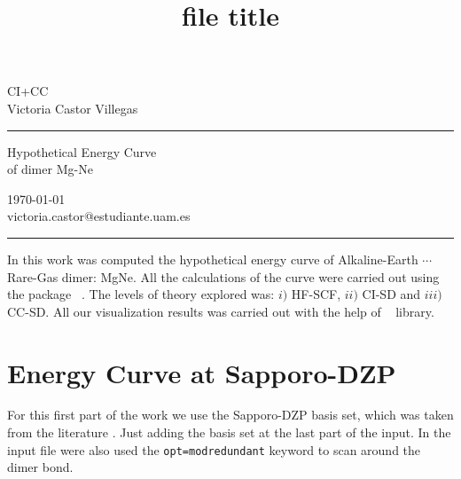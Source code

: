{\setlength{\parindent}{0pt}
\title{file title} %
\fancyhead[C]{}
\begin{minipage}{0.295\textwidth} %
\raggedright
CI+CC\\ %
\footnotesize %
Victoria Castor Villegas %
\medskip\hrule
\end{minipage}
\begin{minipage}{0.4\textwidth} %
\centering 
\large %
Hypothetical Energy Curve\\ %
\normalsize %
of dimer Mg-Ne\\ %
\end{minipage}
\begin{minipage}{0.295\textwidth} %
\raggedleft
\today\\ %
\footnotesize %
victoria.castor@estudiante.uam.es %
\medskip\hrule
\end{minipage}
}


In this work was computed the hypothetical energy curve of Alkaline-Earth
$\cdots$ Rare-Gas dimer: MgNe. All the calculations of the curve were carried
out using the package {}~\cite{g16}. The levels of theory
explored was: $i)$ HF-SCF, $ii)$ CI-SD and $iii)$ CC-SD. All our visualization
results was carried out with the help of
{}~\cite{Hunter2007} library.

\section{\textbf{Energy Curve at Sapporo-DZP}}

For this first part of the work we use the Sapporo-DZP basis set, which was taken from the
literature \cite{basis_set, Pritchard2019}. Just adding  the basis set at the last part of the
{} input. In the input file were also used the \texttt{opt=modredundant}
{} keyword to scan around the dimer bond.

